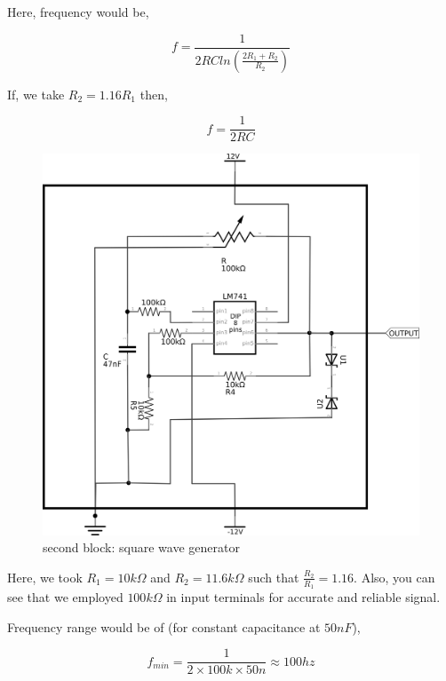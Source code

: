 \documentclass{article}
\begin{document}
Here, frequency would be, 

\begin{equation}
\label{eq:orgcdc5051}
  f =\frac{1}{2 RC ln(\frac{2R_{1}+R_{2}}{R_{2}})}
\end{equation}

If, we take \(R_{2}=1.16R_{1}\) then, 

\begin{equation}
\label{eq:org2f007fe}
  f =\frac{1}{2RC}
\end{equation}

\begin{figure}[htbp]
\centering
\includegraphics[width=0.95 \textwidth]{imgs/squarereal.png}
\caption{\label{fig:org3bf3901}second block: square wave generator}
\end{figure}

Here, we took \(R_{1} = 10k\Omega\) and \(R_{2} = 11.6k\Omega\) such that \(\frac{R_{2}}{R_{1}}=1.16\). Also, you can see that we employed \(100k\Omega\) in input terminals for accurate and reliable signal.

Frequency range would be of (for constant capacitance at \(50nF\)),

\begin{equation*}
\label{eq:orgaa994ed}
  f_{min} =\frac{1}{2\times 100k\times 50n} \approx 100 hz
\end{equation*}
\end{document}
